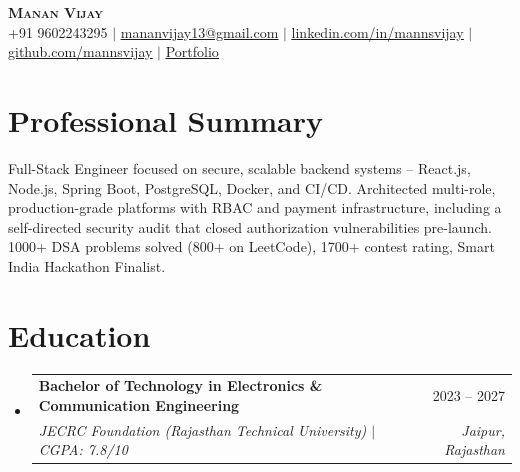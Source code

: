 \documentclass[letterpaper,11pt]{article}
\makeatletter
\newcommand{\resumeSubheading}[4]{
  \vspace{-2pt}\item
    \begin{tabular*}{0.97\textwidth}[t]{l@{\extracolsep{\fill}}r}
      \textbf{#1} & #2 \\
      \textit{\small#3} & \textit{\small #4} \\
    \end{tabular*}\vspace{-9pt}
}
\newcommand{\resumeSubHeadingListStart}{\begin{itemize}[leftmargin=0.15in, label={}]}
\newcommand{\resumeSubHeadingListEnd}{\end{itemize}}
\makeatother
\begin{document}

\begin{center}
    \textbf{\Huge \scshape Manan Vijay} \\ \vspace{3pt}
    \small
    +91 9602243295 $|$
    \href{mailto:mananvijay13@gmail.com}{\underline{mananvijay13@gmail.com}} $|$
    \href{https://www.linkedin.com/in/mannsvijay/}{\underline{linkedin.com/in/mannsvijay}} $|$
    \href{https://github.com/mannsvijay}{\underline{github.com/mannsvijay}} $|$
    \href{https://portfolio-mannsvijays-projects.vercel.app/}{\underline{Portfolio}}
\end{center}

\section{Professional  Summary}
\small{
Full-Stack Engineer focused on secure, scalable backend systems -- React.js, Node.js, Spring Boot, PostgreSQL, Docker, and CI/CD. Architected multi-role, production-grade platforms with RBAC and payment infrastructure, including a self-directed security audit that closed authorization vulnerabilities pre-launch. 1000+ DSA problems solved (800+ on LeetCode), 1700+ contest rating, Smart India Hackathon Finalist.
}
\section{Education}
  \resumeSubHeadingListStart
    \resumeSubheading
      {Bachelor of Technology in Electronics \& Communication Engineering}{2023 --  2027}
      {JECRC Foundation (Rajasthan Technical University) $|$ CGPA: 7.8/10}{Jaipur, Rajasthan}
  \resumeSubHeadingListEnd
\end{document}
